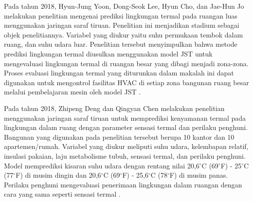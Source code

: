 Pada tahun 2018, Hyun-Jung Yoon, Dong-Seok Lee, Hyun Cho, dan Jae-Hun Jo melakukan penelitian mengenai prediksi lingkungan termal pada ruangan luas menggunakan jaringan saraf tiruan. Penelitian ini menjadikan stadium sebagai objek penelitiannya. Variabel yang diukur yaitu suhu permukaan tembok dalam ruang, dan suhu udara luar. Penelitian tersebut menyimpulkan bahwa metode prediksi lingkungan termal diusulkan menggunakan model JST untuk mengevaluasi lingkungan termal di ruangan besar yang dibagi menjadi zona-zona. Proses evaluasi lingkungan termal yang diturunkan dalam makalah ini dapat digunakan untuk mengontrol fasilitas HVAC di setiap zona bangunan ruang besar melalui pembelajaran mesin oleh model JST \cite{article16}.

Pada tahun 2018, Zhipeng Deng dan Qingyan Chen melakukan penelitian menggunakan jaringan saraf tiruan untuk memprediksi kenyamanan termal pada lingkungan dalam ruang dengan parameter sensasi termal dan perilaku penghuni. Bangunan yang digunakan pada penelitian tersebut berupa 10 kantor dan 10 apartemen/rumah. Variabel yang diukur meliputi suhu udara, kelembapan relatif, insulasi pakaian, laju metabolisme tubuh, sensasi termal, dan perilaku penghuni. Model memprediksi kisaran suhu udara dengan rentang nilai 20,6$^{\circ}$C (69$^{\circ}$F) - 25$^{\circ}$C (77$^{\circ}$F) di musim dingin dan 20,6$^{\circ}$C (69$^{\circ}$F) - 25,6$^{\circ}$C (78$^{\circ}$F) di musim panas. Perilaku penghuni mengevaluasi penerimaan lingkungan dalam ruangan dengan cara yang sama seperti sensasi termal \cite{article17}.

